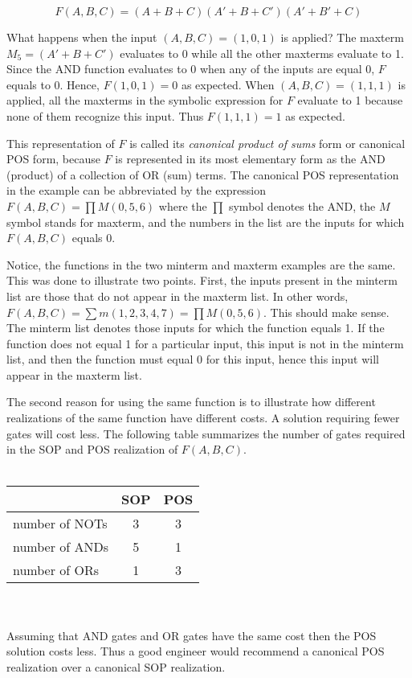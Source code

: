 $$F(A,B,C) =  (A+B+C)(A'+B+C')(A'+B'+C)$$

What happens when the input $(A,B,C)=(1,0,1)$ is applied?  
The maxterm $M_5=(A'+B+C')$ evaluates to 0 while all the other maxterms 
evaluate to 1.  Since the AND function evaluates to 0 when any of 
the inputs are equal 0, $F$ equals to 0. Hence, $F(1,0,1)=0$ as
expected.  When $(A,B,C)=(1,1,1)$ is applied, all the
maxterms in the symbolic expression for $F$ evaluate to 1 because
none of them recognize this input.  Thus $F(1,1,1)=1$ as expected.

This representation of $F$ is called its \textit{canonical product of sums} 
form or canonical POS form, because $F$ is represented in its most
elementary form as the AND (product) of a collection of OR (sum) terms.  
The canonical POS representation in the example can be abbreviated by 
the expression $F(A,B,C) = \prod M(0,5,6)$  where the $\prod$
symbol denotes the AND, the $M$ symbol stands for maxterm, and the 
numbers in the list are the inputs for which $F(A,B,C)$ equals 0.

Notice, the functions in the two minterm and maxterm examples are the 
same.  This was done to illustrate two points.  First, the inputs 
present in the minterm list are those that do not appear in the maxterm 
list.  In other words, $F(A,B,C) = \sum m(1,2,3,4,7) = \prod M (0,5,6)$.  
This should make sense. The minterm list denotes those inputs for 
which the function equals 1.  If the function does not equal 1 for 
a particular input, this input is not in the minterm list, and then the 
function must equal 0 for this input, hence this input will appear 
in the maxterm list.

The second reason for using the same function is to illustrate
how different realizations of the same function have different costs.
A solution requiring fewer gates
will cost less.  The following table summarizes the number of gates 
required in the SOP and POS realization of $F(A,B,C)$.
\\ \\
\begin{tabular}[ht]{l|c|c}
		    & SOP 	& POS	\\ \hline
 number of NOTs & 3	& 3	\\ \hline
 number of ANDs & 5	& 1	\\ \hline
 number of ORs  & 1	& 3	\\ 
\end{tabular}
\\ \\
Assuming that AND gates and OR gates have the same cost then the POS 
solution costs less.  Thus a good engineer would recommend a 
canonical POS realization over a canonical SOP realization.

